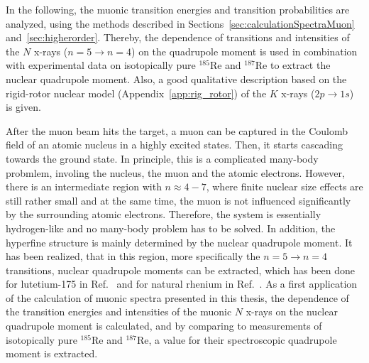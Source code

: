 In the following, the muonic transition energies and transition probabilities are analyzed, using the methods described in Sections~\ref{sec:calculationSpectraMuon} and~\ref{sec:higherorder}. Thereby, the dependence of transitions and intensities of the $N$ x-rays ($n=5\rightarrow n=4$) on the quadrupole moment is used in combination with experimental data on isotopically pure $^{185}$Re and $^{187}$Re to extract the nuclear quadrupole moment. Also, a good qualitative description based on the rigid-rotor nuclear model (Appendix~\ref{app:rig_rotor}) of the $K$ x-rays ($2p\rightarrow 1s$) is given.


After the muon beam hits the target, a muon can be captured in the Coulomb field of an atomic nucleus in a highly excited states. Then, it starts cascading towards the ground state. In principle, this is a complicated many-body probmlem, involing the nucleus, the muon and the atomic electrons. However, there is an intermediate region with $n\approx 4 - 7$, where finite nuclear size effects are still rather small and at the same time, the muon is not influenced significantly by the surrounding atomic electrons. Therefore, the system is essentially hydrogen-like and no many-body problem has to be solved. In addition, the hyperfine structure is mainly determined by the nuclear quadrupole moment. It has been realized, that in this region, more specifically the ${n}{=}{5}\rightarrow{n}{=}{4}$ transitions, nuclear quadrupole moments can be extracted, which has been done for lutetium-175 in Ref.~\cite{Dey1979} and for natural rhenium in Ref.~\cite{konijn1979}.
As a first application of the calculation of muonic spectra presented in this thesis, the dependence of the transition energies and intensities of the muonic $N$ x-rays on the nuclear quadrupole moment is calculated, and by comparing to measurements of isotopically pure $^{185}$Re and $^{187}$Re, a value for their spectroscopic quadrupole moment is extracted.

